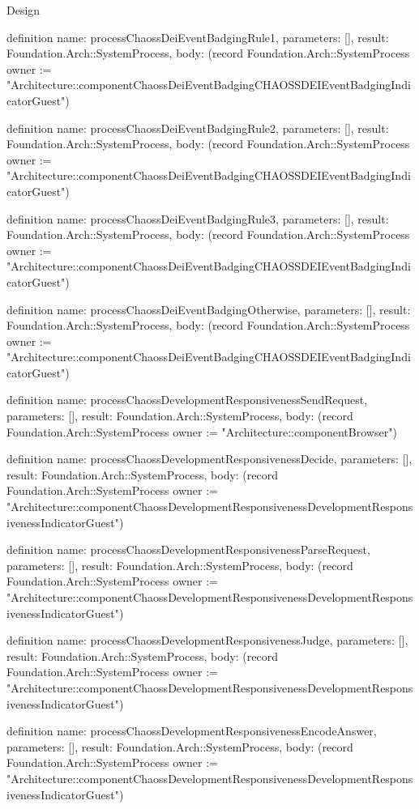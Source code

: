 \begin{lexlean}{Design}
\begin{semanticmodule}
definition{
  name: processChaossDeiEventBadgingRule1,
  parameters: [],
  result: Foundation.Arch::SystemProcess,
  body: (record Foundation.Arch::SystemProcess {owner := "Architecture::componentChaossDeiEventBadgingCHAOSSDEIEventBadgingIndicatorGuest"})
}

definition{
  name: processChaossDeiEventBadgingRule2,
  parameters: [],
  result: Foundation.Arch::SystemProcess,
  body: (record Foundation.Arch::SystemProcess {owner := "Architecture::componentChaossDeiEventBadgingCHAOSSDEIEventBadgingIndicatorGuest"})
}

definition{
  name: processChaossDeiEventBadgingRule3,
  parameters: [],
  result: Foundation.Arch::SystemProcess,
  body: (record Foundation.Arch::SystemProcess {owner := "Architecture::componentChaossDeiEventBadgingCHAOSSDEIEventBadgingIndicatorGuest"})
}

definition{
  name: processChaossDeiEventBadgingOtherwise,
  parameters: [],
  result: Foundation.Arch::SystemProcess,
  body: (record Foundation.Arch::SystemProcess {owner := "Architecture::componentChaossDeiEventBadgingCHAOSSDEIEventBadgingIndicatorGuest"})
}

definition{
  name: processChaossDevelopmentResponsivenessSendRequest,
  parameters: [],
  result: Foundation.Arch::SystemProcess,
  body: (record Foundation.Arch::SystemProcess {owner := "Architecture::componentBrowser"})
}

definition{
  name: processChaossDevelopmentResponsivenessDecide,
  parameters: [],
  result: Foundation.Arch::SystemProcess,
  body: (record Foundation.Arch::SystemProcess {owner := "Architecture::componentChaossDevelopmentResponsivenessDevelopmentResponsivenessIndicatorGuest"})
}

definition{
  name: processChaossDevelopmentResponsivenessParseRequest,
  parameters: [],
  result: Foundation.Arch::SystemProcess,
  body: (record Foundation.Arch::SystemProcess {owner := "Architecture::componentChaossDevelopmentResponsivenessDevelopmentResponsivenessIndicatorGuest"})
}

definition{
  name: processChaossDevelopmentResponsivenessJudge,
  parameters: [],
  result: Foundation.Arch::SystemProcess,
  body: (record Foundation.Arch::SystemProcess {owner := "Architecture::componentChaossDevelopmentResponsivenessDevelopmentResponsivenessIndicatorGuest"})
}

definition{
  name: processChaossDevelopmentResponsivenessEncodeAnswer,
  parameters: [],
  result: Foundation.Arch::SystemProcess,
  body: (record Foundation.Arch::SystemProcess {owner := "Architecture::componentChaossDevelopmentResponsivenessDevelopmentResponsivenessIndicatorGuest"})
}


\end{semanticmodule}
\end{lexlean}
